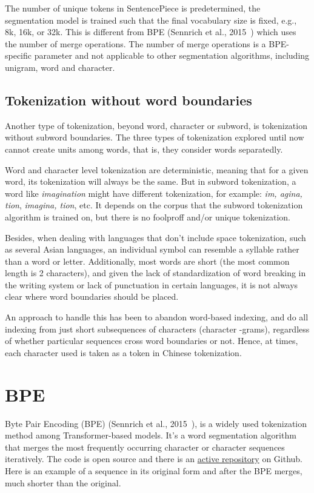 The number of unique tokens in SentencePiece is predetermined, the segmentation model is trained such that the final vocabulary size is fixed, e.g., 8k, 16k, or 32k. This is different from BPE (Sennrich et al., 2015~\cite{sennrich2015neural}) which uses the number of merge operations. The number of merge operations is a BPE-specific parameter and not applicable to other segmentation algorithms, including unigram, word and character.

\subsection{Tokenization without word boundaries}\label{subsec:wordtokwowb}

Another type of tokenization, beyond word, character or subword, is tokenization without subword boundaries. The three types of tokenization explored until now cannot create units among words, that is, they consider words separatedly.

Word and character level tokenization are deterministic, meaning that for a given word, its tokenization will always be the same. But in subword tokenization, a word like \emph{imagination} might have different tokenization, for example: \emph{im, agina, tion}, \emph{imagina, tion}, etc. It depends on the corpus that the subword tokenization algorithm is trained on, but there is no foolproff and/or unique tokenization.

Besides, when dealing with languages that don't include space tokenization, such as several Asian languages, an individual symbol can resemble a syllable rather than a word or letter. Additionally, most words are short (the most common length is 2 characters), and given the lack of standardization of word breaking in the writing system or lack of punctuation in certain languages, it is not always clear where word boundaries should be placed.

An approach to handle this has been to abandon word-based indexing, and do all indexing from just short subsequences of characters (character -grams), regardless of whether particular sequences cross word boundaries or not. Hence, at times, each character used is taken as a token in Chinese tokenization.

\section{BPE}

Byte Pair Encoding (BPE) (Sennrich et al., 2015~\cite{sennrich2015neural}), is a widely used tokenization method among Transformer-based models. It's a word segmentation algorithm that merges the most frequently occurring character or character sequences iteratively. The code is open source and there is an \href{https://github.com/rsennrich/subword-nmt}{active repository} on Github. Here is an example of a sequence in its original form and after the BPE merges, much shorter than the original.

